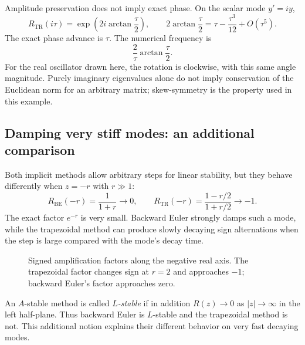 Amplitude preservation does not imply exact phase. On the scalar
mode \(y'=iy\),
\[
 R_{\mathrm{TR}}(i\tau)
   =\exp\left(2i\arctan\frac\tau2\right),
 \qquad
 2\arctan\frac\tau2=\tau-\frac{\tau^3}{12}+O(\tau^5).
\]
The exact phase advance is \(\tau\). The numerical frequency is
\[
 \frac{2}{\tau}\arctan\frac{\tau}{2}.
\]
For the real oscillator drawn here, the
rotation is clockwise, with this same angle magnitude.
Purely imaginary eigenvalues alone do not imply conservation of the
Euclidean norm for an arbitrary matrix; skew-symmetry is the property
used in this example.

\subsection{Damping very stiff modes: an additional comparison}

Both implicit methods allow arbitrary steps for linear stability,
but they behave differently when \(z=-r\) with \(r\gg1\):
\[
 R_{\mathrm{BE}}(-r)=\frac1{1+r}\longrightarrow0,
 \qquad
 R_{\mathrm{TR}}(-r)=\frac{1-r/2}{1+r/2}\longrightarrow-1.
\]
The exact factor \(e^{-r}\) is very small. Backward Euler strongly
damps such a mode, while the trapezoidal method can produce slowly
decaying sign alternations when the step is large compared with the
mode's decay time.

\begin{figure}[htbp]
\centering
{}
\caption{Signed amplification factors along the negative real axis.
The trapezoidal factor changes sign at \(r=2\) and approaches \(-1\);
backward Euler's factor approaches zero.}
\end{figure}

An \(A\)-stable method is called \emph{\(L\)-stable} if in addition
\(R(z)\to0\) as \(|z|\to\infty\) in the left half-plane. Thus backward
Euler is \(L\)-stable and the trapezoidal method is not. This additional
notion explains their different behavior on very fast decaying modes.

